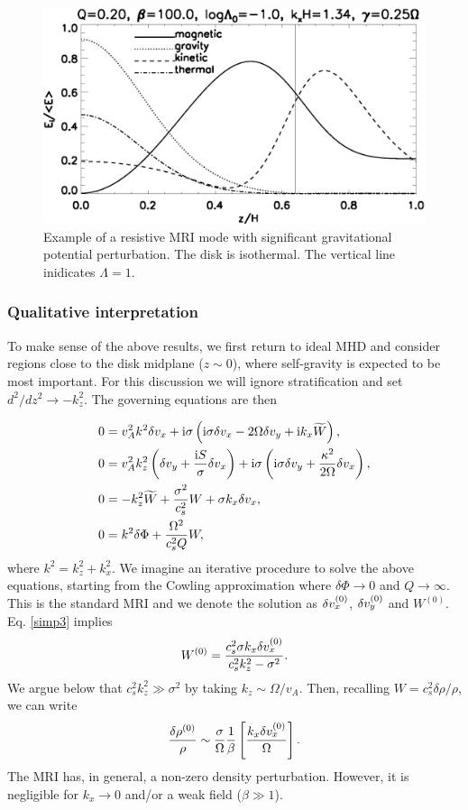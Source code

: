 \begin{figure}
  \includegraphics[width=\linewidth]{figures/result_resis_sg}
  \caption{Example of a resistive MRI mode with significant
    gravitational potential perturbation. The disk is isothermal. 
    The vertical line
    inidicates $\Lambda=1$.  
    \label{mri_massive_resis}}
\end{figure}

\subsubsection{Qualitative interpretation} 
To make sense of the above results, we first return to ideal MHD and 
consider regions close to the disk midplane ($z\sim 0$), where
self-gravity is expected to be most important. For this discussion we
will ignore stratification and set $d^2/dz^2\to -k_z^2$. The governing
equations are then 

\begin{align}
  &  0= v_A^2k^2\delta v_x + \mathrm{i}\sigma\left(\mathrm{i}\sigma \delta v_x - 2\Omega\delta v_y + \mathrm{i} k_x \widetilde{W}\right),\label{simp1}\\
  &  0= v_A^2k_z^2\left(\delta v_y + \frac{\mathrm{i} S
  }{\sigma}\delta v_x\right) + \mathrm{i}\sigma\left(\mathrm{i}\sigma\delta v_y +
  \frac{\kappa^2}{2\Omega}\delta v_x\right),\label{simp2}\\
  & 0 = -k_z^2\widetilde{W} + \frac{\sigma^2}{c_s^2}W + \sigma k_x \delta v_x, \label{simp3}\\
  & 0 = k^2\delta \Phi + \frac{\Omega^2}{c_s^2Q}W,\label{simp4}
\end{align}
where $k^2 = k_z^2 + k_x^2$. We imagine an iterative procedure to
solve the above equations, starting from the Cowling approximation
where $\delta\Phi\to0$ and $Q\to\infty$. This is the standard MRI and we denote the
solution as $\delta v_x^{(0)}$, $\delta v_y^{(0)}$ and $W^{(0)}$. Eq. \ref{simp3} implies
\begin{align}
  W^{(0)} = \frac{c_s^2\sigma k_x \delta v_x^{(0)}}{c_s^2k_z^2 - \sigma^2}. 
\end{align}
We argue below that $c_s^2k_z^2\gg \sigma^2$ by taking $k_z\sim
\Omega/v_A$. Then, recalling $W=c_s^2\delta\rho/\rho$, we can write
\begin{align}
  \frac{\delta\rho^{(0)}}{\rho} \sim
  \frac{\sigma}{\Omega}\frac{1}{\beta}\left[\frac{k_x\delta v_x^{(0)}}{\Omega}\right].   
\end{align}
The MRI has, in general, a non-zero density perturbation. However, it
is negligible for $k_x\to 0$ and/or a weak field ($\beta \gg 1$). 

